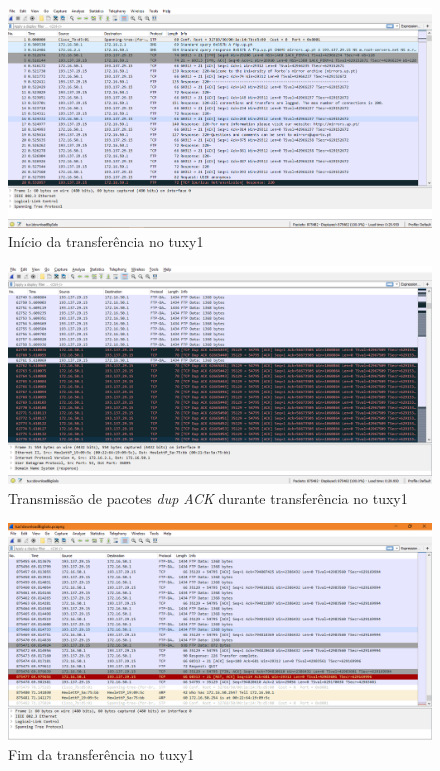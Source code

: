 \documentclass[a4paper, 11pt]{article}
\begin{document}
\begin{figure}[h]
\centering
\includegraphics[scale=0.35]{images/tux1Solo_Inicio.png}
\caption{Início da transferência no tuxy1}
\label{Momentanpol}
\end{figure}
\begin{figure}[h]
\centering
\includegraphics[scale=0.35]{images/tux1Solo_Inicio-Meio.png}
\caption{Transmissão de pacotes  \textit{dup ACK} durante transferência no tuxy1}
\label{Momentanpol}
\end{figure}
\begin{figure}[h]
\centering
\includegraphics[scale=0.35]{images/tux1Solo_Fim-Mesmo.png}
\caption{Fim da transferência no tuxy1}
\label{Momentanpol}
\end{figure}
\end{document}
